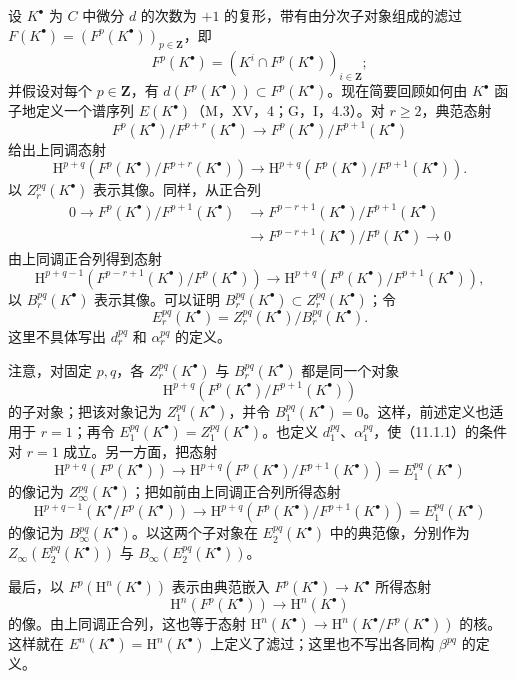 设 $K^\bullet$ 为 $C$ 中微分 $d$ 的次数为 $+1$ 的复形，带有由分次子对象组成的滤过 $F(K^\bullet)=(F^p(K^\bullet))_{p\in\mathbf Z}$，即
\[
F^p(K^\bullet)=(K^i\cap F^p(K^\bullet))_{i\in\mathbf Z};
\]
并假设对每个 $p\in\mathbf Z$，有 $d(F^p(K^\bullet))\subset F^p(K^\bullet)$。现在简要回顾如何由 $K^\bullet$ 函子地定义一个谱序列 $E(K^\bullet)$（M，XV，4；G，I，4.3）。对 $r\geq2$，典范态射
\[
F^p(K^\bullet)/F^{p+r}(K^\bullet)\longrightarrow F^p(K^\bullet)/F^{p+1}(K^\bullet)
\]
给出上同调态射
\[
\mathrm H^{p+q}(F^p(K^\bullet)/F^{p+r}(K^\bullet))\longrightarrow
\mathrm H^{p+q}(F^p(K^\bullet)/F^{p+1}(K^\bullet)).
\]
以 $Z_r^{pq}(K^\bullet)$ 表示其像。同样，从正合列
\[
\begin{aligned}
0\longrightarrow F^p(K^\bullet)/F^{p+1}(K^\bullet)
&\longrightarrow F^{p-r+1}(K^\bullet)/F^{p+1}(K^\bullet)\\
&\longrightarrow F^{p-r+1}(K^\bullet)/F^p(K^\bullet)\longrightarrow0
\end{aligned}
\]
由上同调正合列得到态射
\[
\mathrm H^{p+q-1}(F^{p-r+1}(K^\bullet)/F^p(K^\bullet))\longrightarrow
\mathrm H^{p+q}(F^p(K^\bullet)/F^{p+1}(K^\bullet)),
\]
以 $B_r^{pq}(K^\bullet)$ 表示其像。可以证明 $B_r^{pq}(K^\bullet)\subset Z_r^{pq}(K^\bullet)$；令
\[
E_r^{pq}(K^\bullet)=Z_r^{pq}(K^\bullet)/B_r^{pq}(K^\bullet).
\]
这里不具体写出 $d_r^{pq}$ 和 $\alpha_r^{pq}$ 的定义。

注意，对固定 $p,q$，各 $Z_r^{pq}(K^\bullet)$ 与 $B_r^{pq}(K^\bullet)$ 都是同一个对象
\[
\mathrm H^{p+q}(F^p(K^\bullet)/F^{p+1}(K^\bullet))
\]
的子对象；把该对象记为 $Z_1^{pq}(K^\bullet)$，并令 $B_1^{pq}(K^\bullet)=0$。这样，前述定义也适用于 $r=1$；再令 $E_1^{pq}(K^\bullet)=Z_1^{pq}(K^\bullet)$。也定义 $d_1^{pq}$、$\alpha_1^{pq}$，使（11.1.1）的条件对 $r=1$ 成立。另一方面，把态射
\[
\mathrm H^{p+q}(F^p(K^\bullet))\longrightarrow
\mathrm H^{p+q}(F^p(K^\bullet)/F^{p+1}(K^\bullet))=E_1^{pq}(K^\bullet)
\]
的像记为 $Z_\infty^{pq}(K^\bullet)$；把如前由上同调正合列所得态射
\[
\mathrm H^{p+q-1}(K^\bullet/F^p(K^\bullet))\longrightarrow
\mathrm H^{p+q}(F^p(K^\bullet)/F^{p+1}(K^\bullet))=E_1^{pq}(K^\bullet)
\]
的像记为 $B_\infty^{pq}(K^\bullet)$。以这两个子对象在 $E_2^{pq}(K^\bullet)$ 中的典范像，分别作为 $Z_\infty(E_2^{pq}(K^\bullet))$ 与 $B_\infty(E_2^{pq}(K^\bullet))$。

最后，以 $F^p(\mathrm H^n(K^\bullet))$ 表示由典范嵌入 $F^p(K^\bullet)\to K^\bullet$ 所得态射
\[
\mathrm H^n(F^p(K^\bullet))\longrightarrow\mathrm H^n(K^\bullet)
\]
的像。由上同调正合列，这也等于态射 $\mathrm H^n(K^\bullet)\to\mathrm H^n(K^\bullet/F^p(K^\bullet))$ 的核。这样就在 $E^n(K^\bullet)=\mathrm H^n(K^\bullet)$ 上定义了滤过；这里也不写出各同构 $\beta^{pq}$ 的定义。

